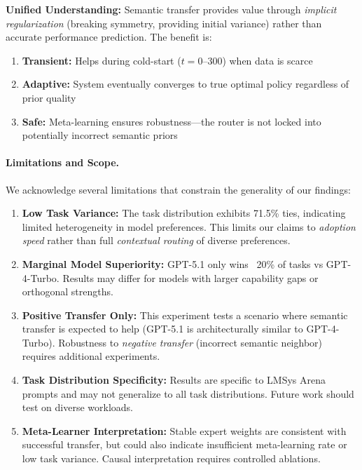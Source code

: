 \textbf{Unified Understanding:} Semantic transfer provides value through \emph{implicit regularization} (breaking symmetry, providing initial variance) rather than accurate performance prediction. The benefit is:
\begin{enumerate}
    \item \textbf{Transient:} Helps during cold-start ($t=0$--300) when data is scarce
    \item \textbf{Adaptive:} System eventually converges to true optimal policy regardless of prior quality
    \item \textbf{Safe:} Meta-learning ensures robustness—the router is not locked into potentially incorrect semantic priors
\end{enumerate}

\paragraph{Limitations and Scope.}
We acknowledge several limitations that constrain the generality of our findings:

\begin{enumerate}
    \item \textbf{Low Task Variance:} The task distribution exhibits 71.5\% ties, indicating limited heterogeneity in model preferences. This limits our claims to \textit{adoption speed} rather than full \textit{contextual routing} of diverse preferences.
    
    \item \textbf{Marginal Model Superiority:} GPT-5.1 only wins ~20\% of tasks vs GPT-4-Turbo. Results may differ for models with larger capability gaps or orthogonal strengths.
    
    \item \textbf{Positive Transfer Only:} This experiment tests a scenario where semantic transfer is expected to help (GPT-5.1 is architecturally similar to GPT-4-Turbo). Robustness to \textit{negative transfer} (incorrect semantic neighbor) requires additional experiments.
    
    \item \textbf{Task Distribution Specificity:} Results are specific to LMSys Arena prompts and may not generalize to all task distributions. Future work should test on diverse workloads.
    
    \item \textbf{Meta-Learner Interpretation:} Stable expert weights are consistent with successful transfer, but could also indicate insufficient meta-learning rate or low task variance. Causal interpretation requires controlled ablations.
\end{enumerate}


